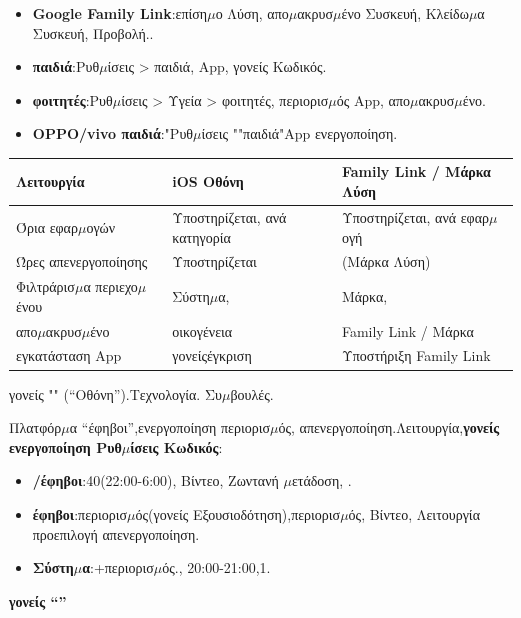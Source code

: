 
\begin{itemize}
  \item \textbf{Google Family Link}:επίση$\mu$ο Λύση, απο$\mu$ακρυσ$\mu$ένο Συσκευή, Κλείδω$\mu$α Συσκευή, Προβολή..
  \item \textbf{παιδιά}:Ρυθ$\mu$ίσεις > παιδιά, App, γονείς Κωδικός.
  \item \textbf{φοιτητές}:Ρυθ$\mu$ίσεις > Υγεία > φοιτητές, περιορισ$\mu$ός App, απο$\mu$ακρυσ$\mu$ένο.
  \item \textbf{OPPO/vivo παιδιά}:"Ρυθ$\mu$ίσεις ""παιδιά"App ενεργοποίηση.
\end{itemize}

\begin{center}
\begin{tabularx}{\linewidth}{|X|X|X|}
\hline
\textbf{Λειτουργία} & \textbf{iOS Οθόνη} & \textbf{Family Link / Μάρκα Λύση} \tabularnewline
\hline
Όρια εφαρ$\mu$ογών & Υποστηρίζεται, ανά κατηγορία & Υποστηρίζεται, ανά εφαρ$\mu$ογή \tabularnewline
Ώρες απενεργοποίησης & Υποστηρίζεται & (Μάρκα Λύση) \tabularnewline
Φιλτράρισ$\mu$α περιεχο$\mu$ένου & Σύστη$\mu$α, & Μάρκα, \tabularnewline
απο$\mu$ακρυσ$\mu$ένο & οικογένεια & Family Link / Μάρκα \tabularnewline
εγκατάσταση App & γονείςέγκριση & Υποστήριξη Family Link \tabularnewline
\hline
\end{tabularx}
\end{center}

\begin{tcbwarn}{γονείς ""}
(“Οθόνη”).Τεχνολογία. Συ$\mu$βουλές.

\end{tcbwarn}


Πλατφόρ$\mu$α “έφηβοι”,ενεργοποίηση περιορισ$\mu$ός, απενεργοποίηση.Λειτουργία,\textbf{γονείς ενεργοποίηση Ρυθ$\mu$ίσεις Κωδικός}:

\begin{itemize}
  \item \textbf{/έφηβοι}:40(22:00-6:00), Βίντεο, Ζωντανή $\mu$ετάδοση, .
  \item \textbf{έφηβοι}:περιορισ$\mu$ός(γονείς Εξουσιοδότηση),περιορισ$\mu$ός, Βίντεο, Λειτουργία προεπιλογή απενεργοποίηση.
  \item \textbf{Σύστη$\mu$α}:+περιορισ$\mu$ός., 20:00-21:00,1.
\end{itemize}

\textbf{γονείς “”}\par

